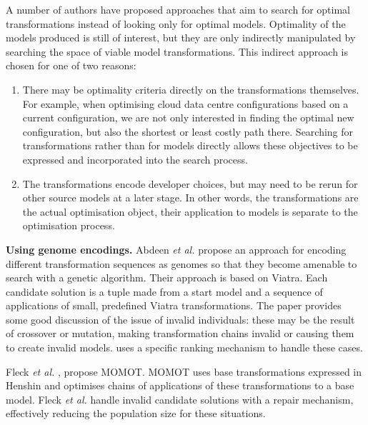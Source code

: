 		A number of authors have proposed approaches that aim to search for optimal transformations instead of looking only for optimal models. Optimality of the
		models produced is still of interest, but they are only indirectly manipulated by searching the space of viable model transformations. This indirect approach
		is chosen for one of two reasons: 
		\begin{enumerate}
			\item There may be optimality criteria directly on the transformations themselves. For example, when optimising cloud data centre configurations based on a
			      current configuration, we are not only interested in finding the optimal new configuration, but also the shortest or least costly path there.
						Searching for transformations rather than for models directly allows these objectives to be expressed and incorporated into the search process.
		  \item The transformations encode developer choices, but may need to be rerun for other source models at a later stage. In other words, the transformations
			      are the actual optimisation object, their application to models is separate to the optimisation process.
		\end{enumerate}
			
		\textbf{Using genome encodings.}
			Abdeen \emph{et al.} \cite{Abdeen+14} propose an approach for encoding different transformation sequences as genomes so that they become amenable to search
			with a genetic algorithm. Their approach is based on Viatra. Each candidate solution is a tuple made from a start model and a sequence of applications of
			small, predefined Viatra transformations. The paper provides some good discussion of the issue of invalid individuals: these may be the result of crossover
			or mutation, making transformation chains invalid or causing them to create invalid models. \cite{Abdeen+14} uses a specific ranking mechanism to handle
			these cases.
			
			Fleck \emph{et al.} \cite{Fleck+15}, propose MOMOT. MOMOT uses base transformations expressed in Henshin and optimises chains of applications of these
			transformations to a base model. Fleck \emph{et al.} handle invalid candidate solutions with a repair mechanism, effectively reducing the population size
			for these situations.
		
